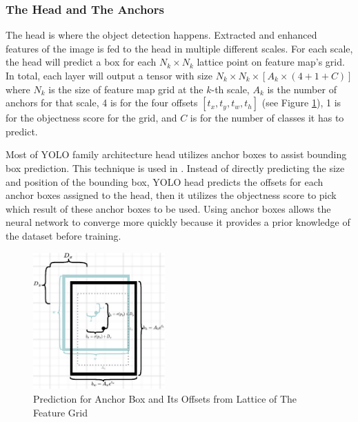   
    \subsubsection{The Head and The Anchors}

    The head is where the object detection happens. Extracted and enhanced features of the image is fed to the head 
    in multiple different scales. For each scale, the head will predict a box for each $N_k \times N_k$
    lattice point on feature map's grid. In total, each layer will output a tensor with size
    $N_k \times N_k \times [A_k \times (4+1+C)]$ where $N_k$ is the size of feature map grid at the $k$-th scale,
    $A_k$ is the number of anchors for that scale, 4 is for the four offsets $[t_x, t_y, t_w, t_h]$ (see Figure 
    \ref{fig:anchorbox}), 1 is for the objectness score for the grid, and $C$ is for the number of classes it has
    to predict.
    
    Most of YOLO family architecture head utilizes anchor boxes to assist bounding box prediction.
    This technique is used in \textcites{yolov2}{yolov3}{yolov4}{scaledyolov4}{yolov5}{yolor}{yolov7}.
    Instead of directly predicting the size and position of the bounding box, YOLO head predicts 
    the offsets for each anchor boxes assigned to the head, then it utilizes the objectness score to pick
    which result  of these anchor boxes to be used.
    Using anchor boxes allows the neural network to converge more quickly because it provides
    a prior knowledge of the dataset before training.
    
    \begin{figure}[t]
        \centering
        \includegraphics[width=0.45\textwidth]{figures/anchor.pdf}
        \caption{Prediction for Anchor Box and Its Offsets from Lattice of The Feature Grid }
        \label{fig:anchorbox}
    \end{figure}

